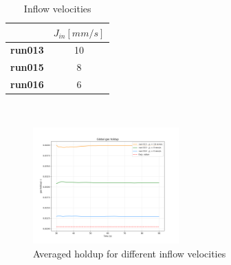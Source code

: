 \documentclass[11pt,a4paper]{article}
\begin{document}
\begin{table}[H]
    \centering 
    \begin{tabular}{|p{8em} c |}
    \hline
    \rowcolor{bluePoli!40}
    & \textbf{$J_{in} [mm/s]$} \T\B \\
    \hline \hline
    \textbf{run013} & 10  \T\B \\
    \textbf{run015} & 8  \T\B \\
    \textbf{run016} & 6 \T\B \\
    \hline
    \end{tabular}
    \\[10pt]
    \caption{Inflow velocities}
    \label{table:inflow_velocities}
\end{table}

\begin{figure}[H]
    \centering
    \includegraphics[width=0.5\textwidth]{Images/graphs/allj/holdUp6.png}
    \caption{Averaged holdup for different inflow velocities}
    \label{fig:holdup_inflow_velocities}
\end{figure}
\end{document}
